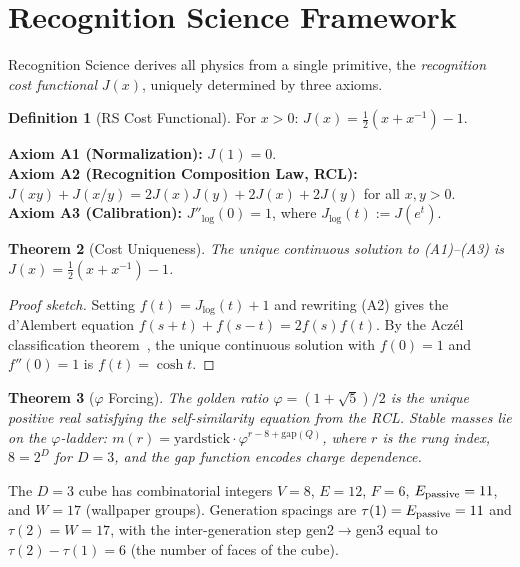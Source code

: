 \documentclass[12pt,a4paper]{article}
\newtheorem{theorem}{Theorem}[section]
\theoremstyle{definition}
\newtheorem{definition}[theorem]{Definition}
\theoremstyle{remark}
\begin{document}
\section{Recognition Science Framework}
\label{sec:framework}

Recognition Science derives all physics from a single primitive,
the \emph{recognition cost functional} $J(x)$, uniquely determined
by three axioms.

\begin{definition}[RS Cost Functional]
For $x > 0$: $J(x) = \tfrac{1}{2}(x + x^{-1}) - 1$.
\end{definition}

\noindent\textbf{Axiom A1 (Normalization):} $J(1) = 0$.\\
\textbf{Axiom A2 (Recognition Composition Law, RCL):}
$J(xy) + J(x/y) = 2J(x)J(y) + 2J(x) + 2J(y)$ for all $x, y > 0$.\\
\textbf{Axiom A3 (Calibration):} $J''_{\log}(0) = 1$, where
$J_{\log}(t) := J(e^t)$.

\begin{theorem}[Cost Uniqueness]
\label{thm:unique}
The unique continuous solution to \textup{(A1)--(A3)} is
$J(x) = \tfrac{1}{2}(x + x^{-1}) - 1$.
\end{theorem}

\begin{proof}[Proof sketch]
Setting $f(t) = J_{\log}(t) + 1$ and rewriting \textup{(A2)} gives the
d'Alembert equation $f(s+t) + f(s-t) = 2f(s)f(t)$.  By the Acz\'el
classification theorem~\cite{Aczel1966}, the unique continuous solution
with $f(0) = 1$ and $f''(0) = 1$ is $f(t) = \cosh t$.
\end{proof}

\begin{theorem}[$\varphi$ Forcing]
\label{thm:phi}
The golden ratio $\varphi = (1+\sqrt{5})/2$ is the unique positive real
satisfying the self-similarity equation from the RCL\@.  Stable masses
lie on the $\varphi$-ladder: $m(r) = \mathrm{yardstick}\cdot\varphi^{r-8+\mathrm{gap}(Q)}$,
where $r$ is the rung index, $8 = 2^D$ for $D=3$, and the gap function
encodes charge dependence.
\end{theorem}

\noindent The $D = 3$ cube has combinatorial integers $V = 8$, $E = 12$, $F = 6$,
$E_{\rm passive} = 11$, and $W = 17$ (wallpaper groups).  Generation spacings
are $\tau(1) = E_{\rm passive} = 11$ and $\tau(2) = W = 17$, with
the inter-generation step gen2$\to$gen3 equal to $\tau(2)-\tau(1) = 6$
(the number of faces of the cube).
\end{document}
